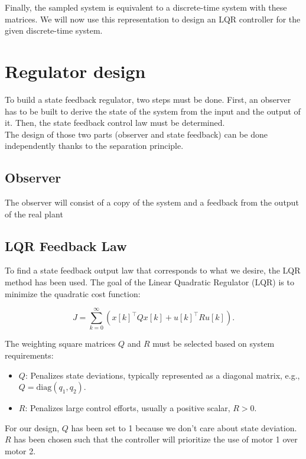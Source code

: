 Finally, the sampled system is equivalent to a discrete-time system with these matrices. We will now use this representation to design an LQR controller for the given discrete-time system.

\section{Regulator design}

To build a state feedback regulator, two steps must be done. First, an observer has to be built to derive the state of 
the system from the input and the output of it. Then, the state feedback control law must be determined.\\
The design of those two parts (observer and state feedback) can be done independently thanks to the separation 
principle.

\subsection{Observer}

The observer will consist of a copy of the system and a feedback from the output of the real plant


\subsection{LQR Feedback Law}

To find a state feedback output law that corresponds to what we desire, the LQR method has been used.
The goal of the Linear Quadratic Regulator (LQR) is to minimize the quadratic cost function:

\[
J = \sum_{k=0}^\infty \left( x[k]^\top Q x[k] + u[k]^\top R u[k] \right).
\]

The weighting square matrices \( Q \) and \( R \) must be selected based on system requirements:

\begin{itemize}
    \item \( Q \): Penalizes state deviations, typically represented as a diagonal matrix, e.g., \( Q = \text{diag}(q_1, q_2) \).
    \item \( R \): Penalizes large control efforts, usually a positive scalar, \( R > 0 \).
\end{itemize}

For our design, $Q$ has been set to 1 because we don't care about state deviation. $R$ has been chosen such that the 
controller will prioritize the use of motor 1 over motor 2. 

